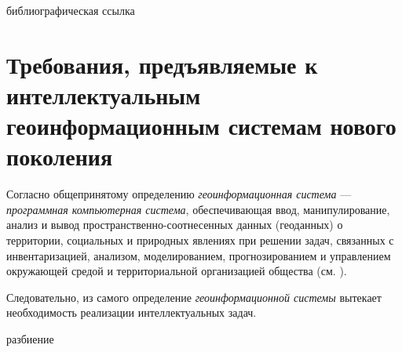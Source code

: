 \begin{SCn}
\begin{scnrelfromlist}{библиографическая ссылка}
\end{scnrelfromlist}
\end{SCn}

\section{Требования, предъявляемые к интеллектуальным геоинформационным системам нового поколения}
\label{chapter_gis_sec_requirements}

Согласно общепринятому определению \textit{геоинформационная система} --- \textit{программная компьютерная система}, обеспечивающая ввод, манипулирование, анализ и вывод пространственно-соотнесенных данных (геоданных) о территории, социальных и природных явлениях при решении задач, связанных с инвентаризацией, анализом, моделированием, прогнозированием и управлением окружающей средой и территориальной организацией общества (см. ).

Следовательно, из самого определение \textit{геоинформационной системы} вытекает необходимость реализации интеллектуальных задач.

\begin{SCn}
\begin{scnrelfromset}{разбиение}
\end{scnrelfromset}
\end{SCn}

